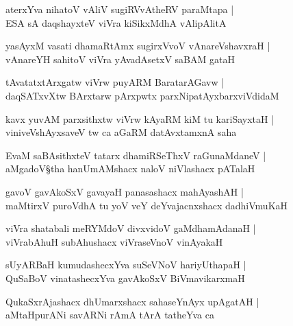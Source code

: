 \begin{shloka}
aterxYva nihatoV vAliV sugiRVvAtheRV paraMtapa |\\
ESA sA daqshayxteV viVra kiSikxMdhA vAlipAlitA 
\end{shloka}

\begin{shloka}
yasAyxM vasati dhamaRtAmx sugirxVvoV vAnareVshavxraH |\\
vAnareYH sahitoV viVra yAvadAsetxV saBAM gataH
\end{shloka}

\begin{shloka}
tAvatatxtArxgatw viVrw puyARM BaratarAGavw |\\
daqSATxvXtw BArxtarw pArxpwtx parxNipatAyxbarxviVdidaM 
\end{shloka}

\begin{shloka}
kavx yuvAM parxsithxtw viVrw kAyaRM kiM tu kariSayxtaH |\\
viniveVshAyxsaveV tw ca aGaRM datAvxtamxnA saha
\end{shloka}

\begin{shloka}
EvaM saBAsithxteV tatarx dhamiRSeThxV raGunaMdaneV |\\
aMgadoV\S tha hanUmAMshacx naloV niVlashacx pATalaH 
\end{shloka}

\begin{shloka}
gavoV gavAkoSxV gavayaH panasashacx mahAyashAH |\\
maMtirxV puroVdhA tu yoV veY deYvajacnxshacx dadhiVmuKaH
\end{shloka}

\begin{shloka}
viVra shatabali meRYMdoV divxvidoV gaMdhamAdanaH |\\
viVrabAhuH subAhushacx viVraseVnoV vinAyakaH
\end{shloka}

\begin{shloka}
sUyARBaH kumudashecxYva suSeVNoV hariyUthapaH |\\
QuSaBoV vinatashecxYva gavAkoSxV BiVmavikarxmaH 
\end{shloka}

\begin{shloka}
QukaSxrAjashacx dhUmarxshacx sahaseYnAyx upAgatAH |\\
aMtaHpurANi savARNi rAmA tArA tatheYva ca 
\end{shloka}

